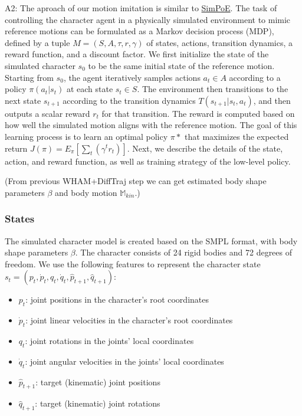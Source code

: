 \documentclass{article}
\begin{document}
A2: The aproach of our motion imitation is similar to \href{https://arxiv.org/abs/2104.00683}{SimPoE}. The task of controlling the character agent in a physically simulated environment to mimic reference motions can be formulated as a Markov decision process (MDP), defined by a tuple \(M=(S,A,\tau,r,\gamma)\) of states, actions, transition dynamics, a reward function, and a discount factor. We first initialize the state of the simulated character \(s_0\) to be the same initial state of the reference motion. Starting from \(s_0\), the agent iteratively samples actions \(a_t \in A\) according to a policy \(\pi(a_t | s_t)\) at each state \(s_t \in S\). The environment then transitions to the next state \(s_{t+1}\) according to the transition dynamics \(T(s_{t+1} | s_t, a_t)\), and then outputs a scalar reward \(r_t\) for that transition. The reward is computed based on how well the simulated motion aligns with the reference motion. The goal of this learning process is to learn an optimal policy \(\pi*\) that maximizes the expected return \(J(\pi) = E_\pi[\sum_t(\gamma^tr_t)]\). Next, we describe the details of the state, action, and reward function, as well as training strategy of the low-level policy.

(From previous WHAM+DiffTraj step we can get estimated body shape parameters \(\beta\) and body motion \(\mathbb{M}_{kin}\).)

\subsubsection{States}\label{states}

The simulated character model is created based on the SMPL format, with body shape parameters \(\beta\). The character consists of 24 rigid bodies and 72 degrees of freedom. We use the following features to represent the character state \(s_t = (p_t, \dot{p}_t, q_t, \dot{q}_t, \hat{p}_{t+1}, \hat{q}_{t+1})\):

\begin{itemize}
\tightlist
\item
  \(p_t\): joint positions in the character's root coordinates
\item
  \(\dot{p}_t\): joint linear velocities in the character's root coordinates
\item
  \(q_t\): joint rotations in the joints' local coordinates
\item
  \(\dot{q}_t\): joint angular velocities in the joints' local coordinates
\item
  \(\hat{p}_{t+1}\): target (kinematic) joint positions
\item
  \(\hat{q}_{t+1}\): target (kinematic) joint rotations
\end{itemize}
\end{document}
